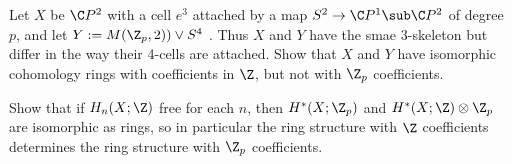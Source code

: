 \documentclass[12pt]{article}
\begin{document}
\begin{homeworkProblem} 
Let $ X $ be $ \C P^{2} $ with a cell $ e^{3} $ attached by a map $ S^{2}\to \C P^{1} \sub \C P^{2}$ of degree $ p $, and let $ Y:= M(\Z_{p},2)) \vee S^{4} $ . Thus $ X $ and $ Y $ have the smae $ 3 $-skeleton but differ in the way their $ 4$-cells are attached. Show that $ X $ and $ Y $ have isomorphic cohomology rings with coefficients in $ \Z $, but not with $ \Z_{p} $ coefficients.
\end{homeworkProblem}

\begin{homeworkProblem}
    Show that if $ H_{n}(X ;\Z) $ free for each $ n $, then $ H^{*}(X ; \Z_{p}) $ and $ H^{*}(X ; \Z) \otimes \Z_{p} $ are isomorphic as rings, so in particular the ring structure with $ \Z $ coefficients determines the ring structure with $ \Z_{p} $ coefficients.
\end{homeworkProblem}
\end{document}

